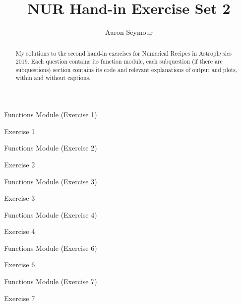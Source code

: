 \documentclass[a4paper,10pt]{article}
\title{NUR Hand-in Exercise Set 2}
\author{Aaron Seymour}
\begin{document}
\maketitle

\begin{abstract}
 My solutions to the second hand-in exercises for Numerical Recipes in Astrophysics 2019. Each question contains its function module, each subquestion (if there are subquestions) section contains its code and relevant explanations of output and plots, within and without captions.
\end{abstract}


\begin{section}{Functions Module (Exercise 1)}

\end{section}

\begin{section}{Exercise 1}

\end{section}


\FloatBarrier
\begin{section}{Functions Module (Exercise 2)}

\end{section}

\begin{section}{Exercise 2}

\end{section}


\FloatBarrier
\begin{section}{Functions Module (Exercise 3)}

\end{section}

\begin{section}{Exercise 3}

\end{section}


\FloatBarrier
\begin{section}{Functions Module (Exercise 4)}

\end{section}

\begin{section}{Exercise 4}

\end{section}


\FloatBarrier
\begin{section}{Functions Module (Exercise 6)}

\end{section}

\begin{section}{Exercise 6}

\end{section}


\FloatBarrier
\begin{section}{Functions Module (Exercise 7)}

\end{section}

\begin{section}{Exercise 7}

\end{section}
  
\end{document}
